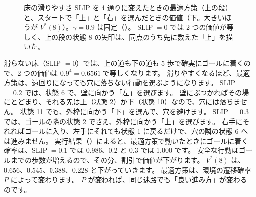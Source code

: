 \begin{figure}[tbp]
\centering
{}

\medskip
{}
\caption{床の滑りやすさ SLIP を 4 通りに変えたときの最適方策（上の段）と、スタートで「上」と「右」を選んだときの価値（下。大きいほうが $V^\ast(8)$）。$\gamma=0.9$ は固定（）。
SLIP $=0$ では 2 つの価値が等しく、上の段の状態 8 の矢印は、同点のうち先に数えた「上」を描いた。}
\label{fig:rlb-slip}
\end{figure}

滑らない床（SLIP $=0$）では、上の道も下の道も 5 歩で確実にゴールに着くので、2 つの価値は $0.9^4=0.6561$ で等しくなります。
滑りやすくなるほど、最適方策は、遠回りになっても穴に落ちない行動を選ぶようになります。
SLIP $=0.2$ では、状態 6 で、壁に向かう「左」を選びます。
壁にぶつかればその場にとどまり、それる先は上（状態 2）か下（状態 10）なので、穴には落ちません。
状態 11 でも、外枠に向かう「下」を選んで、穴を避けます。
SLIP $=0.3$ では、ゴールの隣の状態 2 でさえ、外枠に向かう「上」を選びます。
右手にそれればゴールに入り、左手にそれても状態 1 に戻るだけで、穴の隣の状態 6 へは進みません。
実行結果（）によると、最適方策で動いたときにゴールに着く確率は、SLIP $=0.1$ では 0.986、0.2 と 0.3 では 1.000 です。
安全な行動はゴールまでの歩数が増えるので、その分、割引で価値が下がります。
$V^\ast(8)$ は、0.656、0.545、0.388、0.228 と下がっていきます。
最適方策は、環境の遷移確率 $P$ によって変わります。
$P$ が変われば、同じ迷路でも「良い進み方」が変わるのです。

